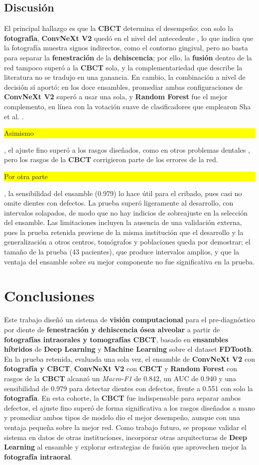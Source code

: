 \documentclass[runningheads]{llncs}
\newcommand{\prob}[1]{\textcolor{problema}{\textbf{#1}}}
\newcommand{\sol}[1]{\textcolor{solucion}{\textbf{#1}}}
\newcommand{\dat}[1]{\textcolor{dataset}{\textbf{#1}}}
\newcommand{\con}[1]{{\setlength{\fboxsep}{0.5pt}\colorbox{yellow}{\strut #1}}}
\newcommand{\prob}[1]{#1}
\newcommand{\sol}[1]{#1}
\newcommand{\dat}[1]{#1}
\newcommand{\con}[1]{#1}
\begin{document}
\subsection{Discusión}
El principal hallazgo es que la \dat{CBCT} determina el desempeño: con
solo la \dat{fotografía}, \sol{ConvNeXt V2} quedó en el nivel del
antecedente \cite{liu2025fdtooth}, lo que indica que la fotografía muestra
signos indirectos, como el contorno gingival, pero no basta para separar
la \prob{fenestración} de la \prob{dehiscencia}; por ello, la
\dat{fusión} dentro de la red tampoco superó a la \dat{CBCT} sola, y la
complementariedad que describe la literatura \cite{feng2026multimodal} no
se tradujo en una ganancia. En cambio, la combinación a nivel de decisión
sí aportó: en los doce ensambles, promediar ambas configuraciones de
\sol{ConvNeXt V2} superó a usar una sola, y \sol{Random Forest} fue el
mejor complemento, en línea con la votación suave de clasificadores que
emplearon Sha et al. \cite{sha2025radiomics}. \con{Asimismo}, el ajuste
fino superó a los rasgos diseñados, como en otros problemas dentales
\cite{rashid2026cielab}, pero los rasgos de la \dat{CBCT} corrigieron
parte de los errores de la red. \con{Por otra parte}, la sensibilidad del
ensamble (0.979) lo hace útil para el cribado, pues casi no omite dientes
con defectos. La prueba superó ligeramente al desarrollo, con
intervalos solapados, de modo que no hay indicios de sobreajuste en la
selección del ensamble. Las limitaciones incluyen la ausencia de una
validación externa, pues la prueba retenida proviene de la misma
institución que el desarrollo y la generalización a otros centros,
tomógrafos y poblaciones queda por demostrar; el tamaño de la prueba
(43 pacientes), que produce
intervalos amplios, y que la ventaja del ensamble sobre su mejor
componente no fue significativa en la prueba.

\section{Conclusiones}
Este trabajo diseñó un sistema de \sol{visión computacional} para el
pre-diagnóstico por diente de \prob{fenestración y dehiscencia ósea
alveolar} a partir de \dat{fotografías intraorales y tomografías CBCT},
basado en \sol{ensambles híbridos} de \sol{Deep Learning} y \sol{Machine
Learning} sobre el dataset \dat{FDTooth}. En la prueba retenida, evaluada
una sola vez, el ensamble de \sol{ConvNeXt V2} con \dat{fotografía y
CBCT}, \sol{ConvNeXt V2} con \dat{CBCT} y \sol{Random Forest} con rasgos
de la \dat{CBCT} alcanzó un \textit{Macro-F1} de 0.842, un AUC de 0.940 y
una sensibilidad de 0.979 para detectar dientes con defectos, frente a
0.551 con solo la \dat{fotografía}. En esta cohorte, la
\dat{CBCT} fue indispensable para separar ambos defectos, el ajuste fino
superó de forma significativa a los rasgos diseñados a mano y promediar
ambos tipos de modelo dio el mejor desempeño, aunque con una ventaja
pequeña sobre la mejor red. Como trabajo futuro, se propone
validar el sistema en datos de otras instituciones, incorporar otras
arquitecturas de \sol{Deep Learning} al ensamble y explorar estrategias de
fusión que aprovechen mejor la \dat{fotografía intraoral}.


\end{document}
